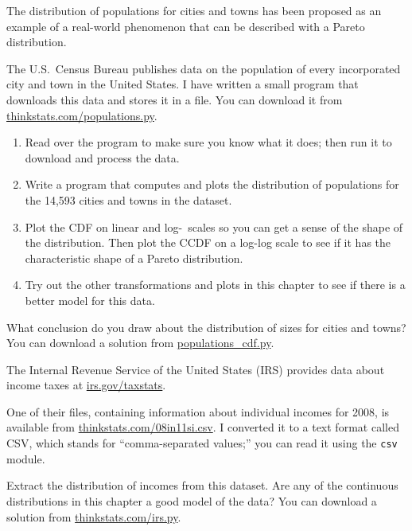 \documentclass[12pt]{book}
\newif\ifplastex
\begin{document}
\begin{exercise}
The distribution of populations for cities and towns has been proposed
as an example of a real-world phenomenon that can be described
with a Pareto distribution.

The U.S.~Census Bureau publishes data on the population of every
incorporated city and town in the United States.  I have written a
small program that downloads this data and stores it in a file.  You
can download it from \url{thinkstats.com/populations.py}.

\begin{enumerate}

\item Read over the program to make sure you know what it does; then
  run it to download and process the data.

\item Write a program that computes and plots the distribution of
  populations for the 14,593 cities and towns in the dataset.

\item Plot the CDF on linear and log-\x~scales so you can get a sense
  of the shape of the distribution.  Then plot the CCDF on a log-log
  scale to see if it has the characteristic shape of a Pareto
  distribution.

\item Try out the other transformations and plots in this chapter to
  see if there is a better model for this data.

\end{enumerate}

What conclusion do you draw about the distribution of sizes
for cities and towns?  You can download a solution from
\url{populations_cdf.py}.

\end{exercise}


\begin{exercise}
\ifplastex
    \Anchor{irs}
\else
    \label{irs}
\fi
The Internal Revenue Service of the United States (IRS) provides data
about income taxes at \url{irs.gov/taxstats}.

One of their files, containing information about individual incomes
for 2008, is available from \url{thinkstats.com/08in11si.csv}.  I
converted it to a text format called CSV, which stands for
``comma-separated values;'' you can read it using the {\tt csv}
module.

Extract the distribution of incomes from this dataset.  Are any of
the continuous distributions in this chapter a good model of
the data?  You can download a solution from \url{thinkstats.com/irs.py}.

\end{exercise}
\end{document}
